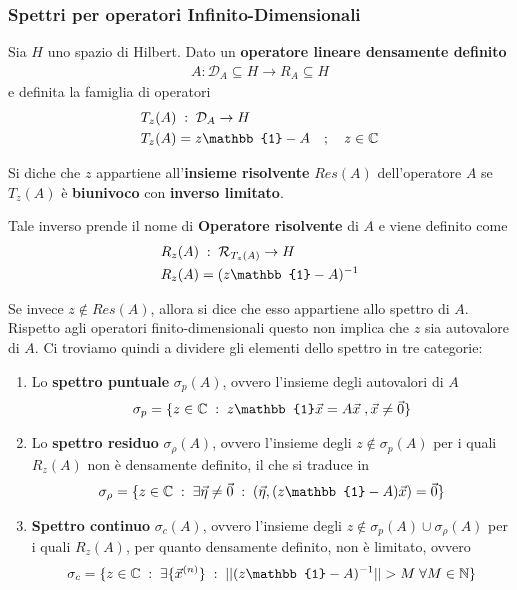 \newpage

\subsubsection{Spettri per operatori Infinito-Dimensionali}

Sia $H$ uno spazio di Hilbert. Dato un \textbf{operatore lineare densamente definito}
\begin{align}
	A : \mathcal{D}_A \subseteq H \rightarrow R_A \subseteq H
\end{align} 
e definita la famiglia di operatori
\begin{align}
	&T_z(A) \taleche \mathcal{D}_A \rightarrow H\\
	&T_z(A) = z\mathbb{1} - A \spacer z \in \C
\end{align}


Si diche che $z$ appartiene all'\textbf{insieme risolvente} $Res(A)$ dell'operatore $A$ se $T_z (A)$ è \textbf{biunivoco} con \textbf{inverso limitato}.

Tale inverso prende il nome di \textbf{Operatore risolvente} di $A$ e viene definito come
\begin{align}
	&R_z(A) \taleche \mathcal{R}_{T_z(A)} \rightarrow H\\
	&R_z(A) = (z\mathbb{1} - A)^{-1}
\end{align}

Se invece $z \notin Res(A)$, allora si dice che esso appartiene allo spettro di $A$.
Rispetto agli operatori finito-dimensionali questo non implica che $z$ sia autovalore di $A$. Ci troviamo quindi a dividere gli elementi dello spettro in tre categorie:
\begin{enumerate}
	\item Lo \textbf{spettro puntuale} $\sigma_p(A)$, ovvero l'insieme degli autovalori di $A$
	\begin{align}
		 \sigma_p= \{ z \in \C \taleche  z \mathbb{1}\vec{x} = A\vec{x} \; , \vec{x} \neq \vec{0} \} 
	\end{align}
	
	\item Lo \textbf{spettro residuo} $\sigma_\rho(A)$, ovvero l'insieme degli $z\notin \sigma_p(A)$ per i quali $R_z(A)$ non è densamente definito, il che si traduce in
	\begin{align}
		 \sigma_\rho= \{ z \in \C \taleche \exists \vec{\eta} \neq \vec{0} \taleche  (\vec{\eta}, (z\mathbb{1} -A)\vec{x})=\vec{0} \} 
	\end{align}
	\item \textbf{Spettro continuo} $\sigma_c(A)$, ovvero l'insieme degli $z\notin \sigma_p(A) \cup \sigma_\rho (A)$  per i quali $R_z(A)$, per quanto densamente definito, non è limitato, ovvero
	\begin{align}
		\sigma_c= \{ z \in \C \taleche \exists \{\vec{x}^{(n)}\} \taleche  ||(z\mathbb{1} -A)^{-1}||> M \; \forall M\in \N \} 
	\end{align}
	
\end{enumerate}




\newpage
